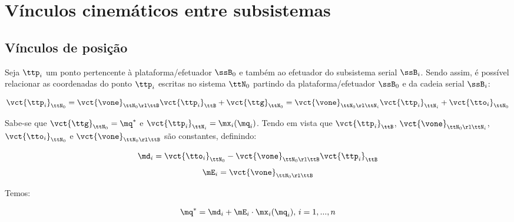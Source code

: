 \documentclass[]{politex}
\begin{document}
\section{Vínculos cinemáticos entre subsistemas} \label{S05-03-02}


\subsection{Vínculos de posição} \label{S05-03-02-01}

Seja $\ttp_i$ um ponto pertencente à plataforma/efetuador $\ssB_0$ e também ao efetuador do subsistema serial $\ssB_i$. Sendo assim, é possível relacionar as coordenadas do ponto $\ttp_i$ escritas no sistema $\ttN_0$ partindo da plataforma/efetuador $\ssB_0$ e da cadeia serial $\ssB_i$:

\begin{equation}
\vct{\ttp_i}_{\ttN_0} = \vct{\vone}_{\ttN_0 \rl \ttB} \vct{\ttp_i}_\ttB + \vct{\ttg}_{\ttN_0} = \vct{\vone}_{\ttN_0 \rl \ttN_i} \vct{\ttp_i}_{\ttN_i} + \vct{\tto_i}_{\ttN_0} 
\end{equation}

Sabe-se que $\vct{\ttg}_{\ttN_0} = \mq^\ast$ e $\vct{\ttp_i}_{\ttN_i} = \mx_i(\mq_i)$. Tendo em vista que $\vct{\ttp_i}_\ttB$, $\vct{\vone}_{\ttN_0 \rl \ttN_i}$, $\vct{\tto_i}_{\ttN_0}$ e $\vct{\vone}_{\ttN_0 \rl \ttB}$ são constantes, definindo:

\begin{equation}
\md_i = \vct{\tto_i}_{\ttN_0} -\vct{\vone}_{\ttN_0 \rl \ttB} \vct{\ttp_i}_\ttB
\end{equation}
\begin{equation}
\mE_i = \vct{\vone}_{\ttN_0 \rl \ttB}
\end{equation}

Temos:

\begin{equation}
\mq^\ast = \md_i + \mE_i \cdot \mx_i(\mq_i), \, i = 1,...,n
\end{equation}
\end{document}
